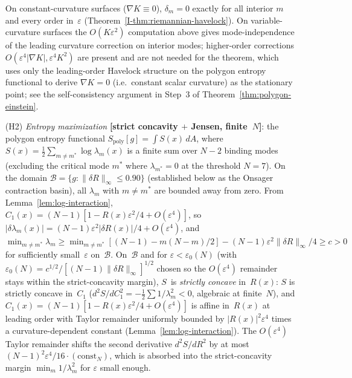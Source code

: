 \begin{theorem}
\begin{enumerate}
  On constant-curvature surfaces ($\nabla K \equiv 0$),
  $\delta_m = 0$ exactly for all interior $m$ and every
  order in~$\varepsilon$ (Theorem~\ref*{I-thm:riemannian-havelock}).
  On variable-curvature surfaces the $O(K\varepsilon^2)$
  computation above gives mode-independence of the leading
  curvature correction on interior modes; higher-order
  corrections $O(\varepsilon^4 |\nabla K|, \varepsilon^4 K^2)$
  are present and are not needed for the theorem, which
  uses only the leading-order Havelock structure on the
  polygon entropy functional to derive
  $\nabla K = 0$ (i.e.\ constant scalar curvature)
  as the stationary point; see the self-consistency
  argument in Step~3 of Theorem~\ref{thm:polygon-einstein}.
\item[\textup{(H2)}]
  \emph{Entropy maximization}
  \textbf{[strict concavity $+$ Jensen, finite~$N$]}:
  the polygon entropy functional
  $S_{\mathrm{poly}}[g] = \int S(x)\,dA$, where
  $S(x) = \tfrac{1}{2}\sum_{m \ne m^*}\log\lambda_m(x)$
  is a finite sum over $N{-}2$ binding modes
  (excluding the critical mode $m^*$ where $\lambda_{m^*} = 0$
  at the threshold $N = 7$).
  On the domain $\mathcal{B} = \{g : \|\delta R\|_\infty \le 0.90\}$
  (established below as the Onsager contraction basin),
  all $\lambda_m$ with $m \ne m^*$ are bounded away from zero.
  From Lemma~\ref{lem:log-interaction},
  $C_1(x) = (N{-}1)[1 - R(x)\varepsilon^2/4 + O(\varepsilon^4)]$,
  so $|\delta\lambda_m(x)| = (N{-}1)\varepsilon^2|\delta R(x)|/4
  + O(\varepsilon^4)$, and
  $\min_{m \ne m^*} \lambda_m
  \ge \min_{m \ne m^*}[(N{-}1) - m(N{-}m)/2]
  - (N{-}1)\varepsilon^2 \|\delta R\|_\infty/4
  \ge c > 0$
  for sufficiently small~$\varepsilon$ on~$\mathcal{B}$.
  On~$\mathcal{B}$ and for $\varepsilon < \varepsilon_0(N)$
  (with $\varepsilon_0(N) = c^{1/2}/[(N{-}1)\|\delta R\|_\infty]^{1/2}$
  chosen so the $O(\varepsilon^4)$ remainder stays within
  the strict-concavity margin),
  $S$~is \emph{strictly concave} in~$R(x)$:
  $S$ is strictly concave in~$C_1$
  ($d^2S/dC_1^2 = -\tfrac{1}{2}\sum 1/\lambda_m^2 < 0$,
  algebraic at finite~$N$),
  and $C_1(x) = (N{-}1)[1 - R(x)\varepsilon^2/4 + O(\varepsilon^4)]$
  is affine in~$R(x)$ at leading order with
  Taylor remainder uniformly bounded by
  $|R(x)|^2 \varepsilon^4$ times a curvature-dependent
  constant (Lemma~\ref{lem:log-interaction}).
  The $O(\varepsilon^4)$ Taylor remainder shifts the
  second derivative $d^2S/dR^2$ by at most
  $(N{-}1)^2\varepsilon^4/16 \cdot (\text{const}_N)$,
  which is absorbed into the strict-concavity margin
  $\min_m 1/\lambda_m^2$ for $\varepsilon$ small enough.

\end{enumerate}
\end{theorem}
